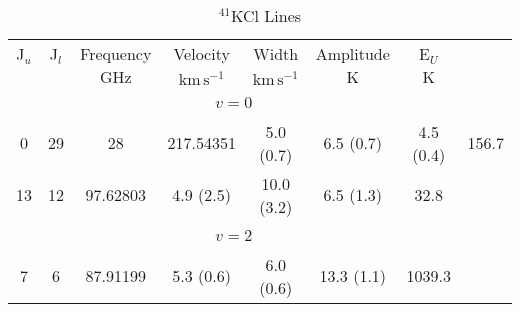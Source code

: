 \begin{table*}[htp]
\centering
\caption{$^{41}$KCl Lines}
\begin{tabular}{ccccccc}
\label{tab:41KCl_salt_lines}
 J$_u$ & J$_l$ & Frequency & Velocity & Width & Amplitude & E$_U$ \\
  &  & $\mathrm{GHz}$ & $\mathrm{km\,s^{-1}}$ & $\mathrm{km\,s^{-1}}$ & $\mathrm{K}$ & $\mathrm{K}$ \\
\hline
&\vspace{-0.75em}\\
 \\
\vspace{-0.75em}\\
0 & 29 & 28 & 217.54351 & 5.0 (0.7) & 6.5 (0.7) & 4.5 (0.4) & 156.7 \\
 13 & 12 & 97.62803 & 4.9 (2.5) & 10.0 (3.2) & 6.5 (1.3) & 32.8 \\
&\vspace{-0.75em}\\
 \\
\vspace{-0.75em}\\
 7 & 6 & 87.91199 & 5.3 (0.6) & 6.0 (0.6) & 13.3 (1.1) & 1039.3 \\
\hline
\end{tabular}

\par 
\end{table*}
